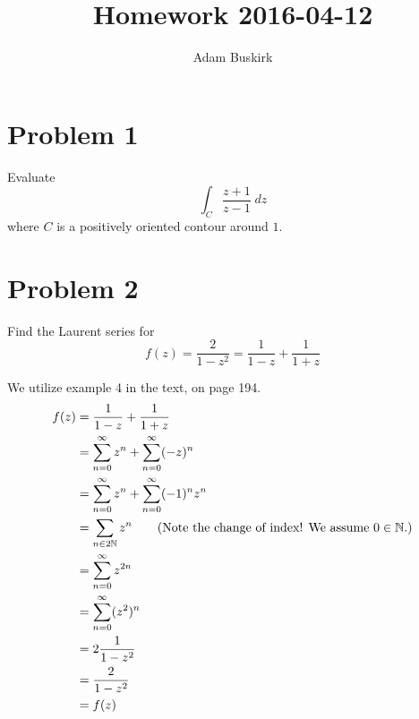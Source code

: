 \documentclass{article}
\title{Homework 2016-04-12}
\author{Adam Buskirk}
\theoremstyle{definition}
\newcommand{\N}{\mathbb{N}}
\begin{document}
\maketitle

\section{Problem 1}
Evaluate \[ \int_C \frac{z+1}{z-1} \;dz \]
where $C$ is a positively oriented contour around $1$.

\section{Problem 2}
Find the Laurent series for 
\[ f(z)= \frac{2}{1-z^2} = \frac{1}{1-z} + \frac{1}{1+z} \]

We utilize example 4 in the text, on page 194.
\begin{align*}
f(z) &= \frac{1}{1-z} + \frac{1}{1+z} \\
&= \sum_{n=0}^\infty z^n + \sum_{n=0}^\infty (-z)^n \\
&= \sum_{n=0}^\infty z^n + \sum_{n=0}^\infty (-1)^n z^n \\
&= \sum_{n \in 2\N} z^n \tag{Note the change of index! We assume $0\in\N$.}\\
&= \sum_{n=0}^\infty z^{2n} \\
&= \sum_{n=0}^\infty (z^2)^n \\
&= 2 \frac{1}{1-z^2} \\
&= \frac{2}{1-z^2} \\
&= f(z)
\end{align*}
\end{document}
